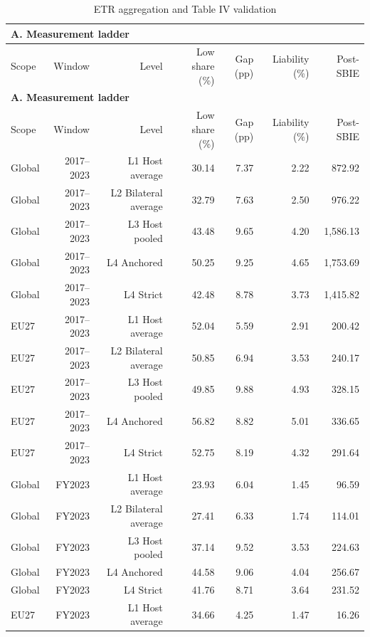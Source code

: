 {\small\setlength{\LTpre}{4pt}\setlength{\LTpost}{4pt}
\begin{longtable}{@{}lrrrrrr@{}}
\caption{ETR aggregation and Table IV validation}\label{tab:tab_v2_etr_ladder_and_crossval} \\
\multicolumn{7}{l}{\textbf{A. Measurement ladder}} \\
\toprule
Scope & Window & Level & Low share (\%) & Gap (pp) & Liability (\%) & Post-SBIE \\
\midrule
\endfirsthead
\multicolumn{7}{l}{\textbf{A. Measurement ladder}} \\
\toprule
Scope & Window & Level & Low share (\%) & Gap (pp) & Liability (\%) & Post-SBIE \\
\midrule
\endhead
\midrule
\endfoot
\bottomrule
\endlastfoot
Global & 2017–2023 & L1 Host average & 30.14 & 7.37 & 2.22 &   872.92 \\
Global & 2017–2023 & L2 Bilateral average & 32.79 & 7.63 & 2.50 &   976.22 \\
Global & 2017–2023 & L3 Host pooled & 43.48 & 9.65 & 4.20 & 1,586.13 \\
Global & 2017–2023 & L4 Anchored & 50.25 & 9.25 & 4.65 & 1,753.69 \\
Global & 2017–2023 & L4 Strict & 42.48 & 8.78 & 3.73 & 1,415.82 \\
EU27 & 2017–2023 & L1 Host average & 52.04 & 5.59 & 2.91 &   200.42 \\
EU27 & 2017–2023 & L2 Bilateral average & 50.85 & 6.94 & 3.53 &   240.17 \\
EU27 & 2017–2023 & L3 Host pooled & 49.85 & 9.88 & 4.93 &   328.15 \\
EU27 & 2017–2023 & L4 Anchored & 56.82 & 8.82 & 5.01 &   336.65 \\
EU27 & 2017–2023 & L4 Strict & 52.75 & 8.19 & 4.32 &   291.64 \\
Global & FY2023 & L1 Host average & 23.93 & 6.04 & 1.45 &    96.59 \\
Global & FY2023 & L2 Bilateral average & 27.41 & 6.33 & 1.74 &   114.01 \\
Global & FY2023 & L3 Host pooled & 37.14 & 9.52 & 3.53 &   224.63 \\
Global & FY2023 & L4 Anchored & 44.58 & 9.06 & 4.04 &   256.67 \\
Global & FY2023 & L4 Strict & 41.76 & 8.71 & 3.64 &   231.52 \\
EU27 & FY2023 & L1 Host average & 34.66 & 4.25 & 1.47 &    16.26 \\

\end{longtable}}
